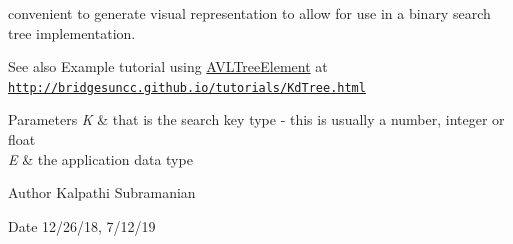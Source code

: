 convenient to generate visual representation to allow for use in a binary search tree implementation.

\begin{DoxySeeAlso}{See also}
Example tutorial using \mbox{\hyperlink{classbridges_1_1base_1_1_a_v_l_tree_element}{A\+V\+L\+Tree\+Element}} at \href{http://bridgesuncc.github.io/tutorials/KdTree.html}{\tt http\+://bridgesuncc.\+github.\+io/tutorials/\+Kd\+Tree.\+html}
\end{DoxySeeAlso}

\begin{DoxyParams}{Parameters}
{\em K} & that is the search key type -\/ this is usually a number, integer or float \\
\hline
{\em E} & the application data type\\
\hline
\end{DoxyParams}
\begin{DoxyAuthor}{Author}
Kalpathi Subramanian 
\end{DoxyAuthor}
\begin{DoxyDate}{Date}
12/26/18, 7/12/19 
\end{DoxyDate}
